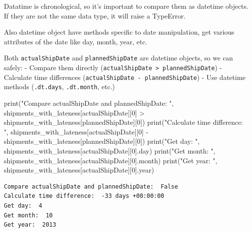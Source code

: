 \documentclass[
]{article}
\newenvironment{Shaded}{\begin{snugshade}}{\end{snugshade}}
\newcommand{\BuiltInTok}[1]{\textcolor[rgb]{0.00,0.23,0.31}{#1}}
\newcommand{\DecValTok}[1]{\textcolor[rgb]{0.68,0.00,0.00}{#1}}
\newcommand{\NormalTok}[1]{\textcolor[rgb]{0.00,0.23,0.31}{#1}}
\newcommand{\OperatorTok}[1]{\textcolor[rgb]{0.37,0.37,0.37}{#1}}
\newcommand{\StringTok}[1]{\textcolor[rgb]{0.13,0.47,0.30}{#1}}
\begin{document}
Datatime is chronological, so it's important to compare them as datetime
objects. If they are not the same data type, it will raise a TypeError.

Also datetime object have methods specific to date manipulation, get
various attributes of the date like day, month, year, etc.

Both \texttt{actualShipDate} and \texttt{plannedShipDate} are datetime
objects, so we can safely: - Compare them directly
(\texttt{actualShipDate\ \textgreater{}\ plannedShipDate}) - Calculate
time differences (\texttt{actualShipDate\ -\ plannedShipDate}) - Use
datetime methods (\texttt{.dt.days}, \texttt{.dt.month}, etc.)

\label{compare-dates}
\begin{Shaded}
\begin{Highlighting}[]
\BuiltInTok{print}\NormalTok{(}\StringTok{"Compare actualShipDate and plannedShipDate: "}\NormalTok{, shipments\_with\_lateness[}\StringTok{\textquotesingle{}actualShipDate\textquotesingle{}}\NormalTok{][}\DecValTok{0}\NormalTok{] }\OperatorTok{\textgreater{}}\NormalTok{ shipments\_with\_lateness[}\StringTok{\textquotesingle{}plannedShipDate\textquotesingle{}}\NormalTok{][}\DecValTok{0}\NormalTok{])}
\BuiltInTok{print}\NormalTok{(}\StringTok{"Calculate time difference: "}\NormalTok{, shipments\_with\_lateness[}\StringTok{\textquotesingle{}actualShipDate\textquotesingle{}}\NormalTok{][}\DecValTok{0}\NormalTok{] }\OperatorTok{{-}}\NormalTok{ shipments\_with\_lateness[}\StringTok{\textquotesingle{}plannedShipDate\textquotesingle{}}\NormalTok{][}\DecValTok{0}\NormalTok{])}
\BuiltInTok{print}\NormalTok{(}\StringTok{"Get day: "}\NormalTok{, shipments\_with\_lateness[}\StringTok{\textquotesingle{}actualShipDate\textquotesingle{}}\NormalTok{][}\DecValTok{0}\NormalTok{].day)}
\BuiltInTok{print}\NormalTok{(}\StringTok{"Get month: "}\NormalTok{, shipments\_with\_lateness[}\StringTok{\textquotesingle{}actualShipDate\textquotesingle{}}\NormalTok{][}\DecValTok{0}\NormalTok{].month)}
\BuiltInTok{print}\NormalTok{(}\StringTok{"Get year: "}\NormalTok{, shipments\_with\_lateness[}\StringTok{\textquotesingle{}actualShipDate\textquotesingle{}}\NormalTok{][}\DecValTok{0}\NormalTok{].year)}
\end{Highlighting}
\end{Shaded}

\begin{verbatim}
Compare actualShipDate and plannedShipDate:  False
Calculate time difference:  -33 days +00:00:00
Get day:  4
Get month:  10
Get year:  2013
\end{verbatim}
\end{document}
